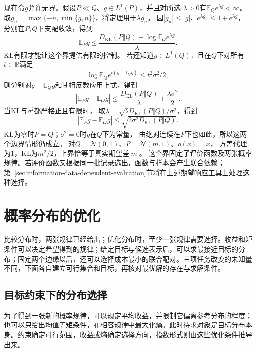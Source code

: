 现在令\(g\)允许无界。假设\(P\ll Q\)、\(g\in L^1(P)\)，并且对所选
\(\lambda>0\)有\(\mathbb E_Qe^{\lambda g}<\infty\)。
取\(g_n=\max\{-n,\min\{g,n\}\}\)，将定理用于\(\lambda g_n\)。
因\(|g_n|\leq|g|\)、\(e^{\lambda g_n}\leq1+e^{\lambda g}\)，
分别在\(P,Q\)下支配收敛，得到
\begin{equation}
  \mathbb E_Pg
  \leq\frac{D_{\mathrm{KL}}(P\Vert Q)+\log\mathbb E_Qe^{\lambda g}}{\lambda}.
  \label{eq:information-change-measure-expectation}
\end{equation}
KL有限才能让这个界提供有限的控制。
若还知道\(g\in L^1(Q)\)，且在\(Q\)下对所有\(t\in\mathbb R\)满足
\[
  \log\mathbb E_Qe^{t(g-\mathbb E_Qg)}\leq t^2\sigma^2/2,
\]
则分别对\(g-\mathbb E_Qg\)和其相反数应用上式，得到
\[
  |\mathbb E_Pg-\mathbb E_Qg|
  \leq\frac{D_{\mathrm{KL}}(P\Vert Q)}{\lambda}+\frac{\lambda\sigma^2}{2}.
\]
当KL与\(\sigma^2\)都严格正且有限时，
取\(\lambda=\sqrt{2D_{\mathrm{KL}}(P\Vert Q)/\sigma^2}\)，得到
\begin{equation}
  |\mathbb E_Pg-\mathbb E_Qg|
  \leq\sqrt{2\sigma^2D_{\mathrm{KL}}(P\Vert Q)}.
  \label{eq:information-subgaussian-change-measure}
\end{equation}
KL为零时\(P=Q\)；\(\sigma^2=0\)时\(g\)在\(Q\)下为常量，
由绝对连续在\(P\)下也如此，所以这两个边界情形仍成立。
对\(Q=\mathcal N(0,1)\)、\(P=\mathcal N(m,1)\)、\(g(x)=x\)，
方差代理为\(1\)，KL为\(m^2/2\)，上界恰等于真实期望差\(|m|\)。
这个界固定了评价函数及两张概率规律。若评价函数又根据同一批记录选出，函数与样本会产生联合依赖；第~\ref{sec:information-data-dependent-evaluation}节将在上述期望响应工具上处理这种选择。

\section{概率分布的优化}
\label{sec:information-variational-learning}

比较分布时，两张规律已经给出；优化分布时，至少一张规律需要选择。收益和矩条件可以决定希望得到的规律；给定目标与候选表示后，可以求最接近目标的分布；固定两个边缘以后，还可以选择成本最小的联合配对。三项任务改变的未知量不同，下面各自建立可行集合和目标，再核对最优解的存在与求解条件。

\subsection{目标约束下的分布选择}
\label{sec:information-target-distribution}

为了得到一张新的概率规律，可以规定平均收益，并限制它偏离参考分布的程度；也可以只给出均值等矩条件，在相容规律中最大化熵。此时待求对象是目标分布本身。约束确定可行范围，收益或熵确定选择方向，指数形式则由这些优化条件推导出来。

